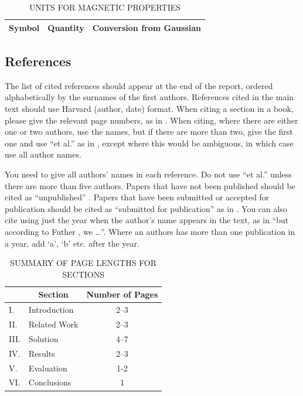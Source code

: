 \documentclass[conference]{IEEEtran}
\begin{document}
\begin{table}[htb]
\centering
\caption{UNITS FOR MAGNETIC PROPERTIES}
\vspace*{6pt}
\label{units}
\begin{tabular}{ccc}\hline\hline
Symbol & Quantity & Conversion from Gaussian \\ \hline
\end{tabular}
\end{table}

\subsection{References}

The list of cited references should appear at the end of the report, ordered alphabetically by the surnames of the first authors.  References cited in the main text should use Harvard (author, date) format.  When citing a section in a book, please give the relevant page numbers, as in \cite[p293]{budgen}.  When citing, where there are either one or two authors, use the names, but if there are more than two, give the first one and use ``et al.'' as in  , except where this would be ambiguous, in which case use all author names.

You need to give all authors' names in each reference.  Do not use ``et al.'' unless there are more than five authors.  Papers that have not been published should be cited as ``unpublished'' \cite{euther}.  Papers that have been submitted or accepted for publication should be cited as ``submitted for publication'' as in \cite{futher} .  You can also cite using just the year when the author's name appears in the text, as in ``but according to Futher \citeyear{futher}, we \dots''.  Where an authors has more than one publication in a year, add `a', `b' etc. after the year.

\begin{table}[htb]
\centering
\caption{SUMMARY OF PAGE LENGTHS FOR SECTIONS}
\vspace*{6pt}
\label{summary}
\begin{tabular}{|ll|c|} \hline
& \multicolumn{1}{c|}{\bf Section} & {\bf Number of Pages} \\ \hline
I. & Introduction & 2--3 \\ \hline
II. & Related Work & 2--3 \\ \hline
III. & Solution & 4--7 \\ \hline
IV. & Results & 2--3 \\ \hline
V. & Evaluation & 1-2 \\ \hline
VI. & Conclusions & 1 \\ \hline
\end{tabular}
\end{table}
\end{document}
